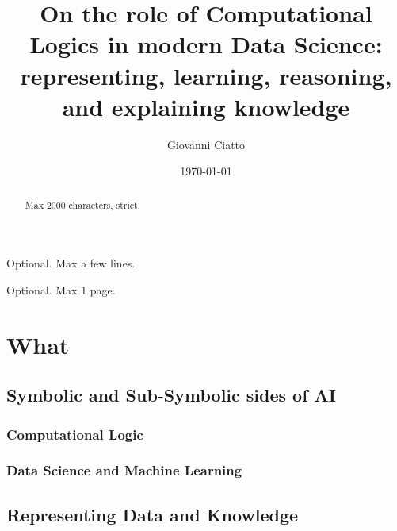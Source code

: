 \documentclass[12pt,a4paper,openright,twoside]{book}
\title{On the role of Computational Logics in modern Data Science: representing, learning, reasoning, and explaining knowledge}
\author{Giovanni Ciatto}
\date{\today}
\begin{document}
	
\frontmatter



\begin{abstract}	
Max 2000 characters, strict.
\end{abstract}

\begin{dedication} %
Optional. Max a few lines.
\end{dedication}

\begin{acknowledgements} %
Optional. Max 1 page.
\end{acknowledgements}

\tableofcontents   
\listoffigures     %
\lstlistoflistings %

\mainmatter

\chapter{\introductionname}
\label{chap:introduction}

\part{What}
\label{part:what}

\chapter{Symbolic and Sub-Symbolic sides of AI}

\section{Computational Logic}

\section{Data Science and Machine Learning}

\chapter{Representing Data and Knowledge}
\end{document}
